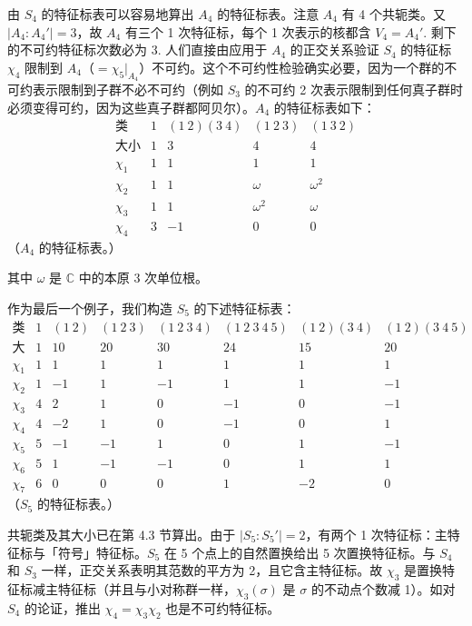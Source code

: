 由 \(S_4\) 的特征标表可以容易地算出 \(A_4\) 的特征标表。注意 \(A_4\) 有 4 个共轭类。又 \(|A_4 : A_4'| = 3\)，故 \(A_4\) 有三个 1 次特征标，每个 1 次表示的核都含 \(V_4 = A_4'\). 剩下的不可约特征标次数必为 3. 人们直接由应用于 \(A_4\) 的正交关系验证 \(S_4\) 的特征标 \(\chi_4\) 限制到 \(A_4\)（\(= \chi_5|_{A_4}\)）不可约。这个不可约性检验确实必要，因为一个群的不可约表示限制到子群不必不可约（例如 \(S_3\) 的不可约 2 次表示限制到任何真子群时必须变得可约，因为这些真子群都阿贝尔）。\(A_4\) 的特征标表如下：
\[
\begin{array}{c|cccc}
\text{类} & 1 & (1\ 2)(3\ 4) & (1\ 2\ 3) & (1\ 3\ 2)\\ \hline
\text{大小} & 1 & 3 & 4 & 4\\
\chi_1 & 1 & 1 & 1 & 1\\
\chi_2 & 1 & 1 & \omega & \omega^2\\
\chi_3 & 1 & 1 & \omega^2 & \omega\\
\chi_4 & 3 & -1 & 0 & 0
\end{array}
\]
（\(A_4\) 的特征标表。）

其中 \(\omega\) 是 \(\mathbb{C}\) 中的本原 3 次单位根。

作为最后一个例子，我们构造 \(S_5\) 的下述特征标表：
\[
\begin{array}{c|ccccccc}
\text{类} & 1 & (1\ 2) & (1\ 2\ 3) & (1\ 2\ 3\ 4) & (1\ 2\ 3\ 4\ 5) & (1\ 2)(3\ 4) & (1\ 2)(3\ 4\ 5)\\ \hline
\text{大小} & 1 & 10 & 20 & 30 & 24 & 15 & 20\\
\chi_1 & 1 & 1 & 1 & 1 & 1 & 1 & 1\\
\chi_2 & 1 & -1 & 1 & -1 & 1 & 1 & -1\\
\chi_3 & 4 & 2 & 1 & 0 & -1 & 0 & -1\\
\chi_4 & 4 & -2 & 1 & 0 & -1 & 0 & 1\\
\chi_5 & 5 & -1 & -1 & 1 & 0 & 1 & -1\\
\chi_6 & 5 & 1 & -1 & -1 & 0 & 1 & 1\\
\chi_7 & 6 & 0 & 0 & 0 & 1 & -2 & 0
\end{array}
\]
（\(S_5\) 的特征标表。）

共轭类及其大小已在第 4.3 节算出。由于 \(|S_5 : S_5'| = 2\)，有两个 1 次特征标：主特征标与「符号」特征标。\(S_5\) 在 5 个点上的自然置换给出 5 次置换特征标。与 \(S_4\) 和 \(S_3\) 一样，正交关系表明其范数的平方为 2，且它含主特征标。故 \(\chi_3\) 是置换特征标减主特征标（并且与小对称群一样，\(\chi_3(\sigma)\) 是 \(\sigma\) 的不动点个数减 1）。如对 \(S_4\) 的论证，推出 \(\chi_4 = \chi_3\chi_2\) 也是不可约特征标。

